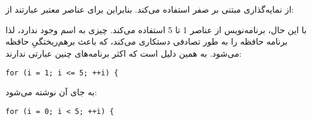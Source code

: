 \section{}
\paragraph{}\label{answer:90}
 از نمایه‌گذاری مبتنی بر صفر استفاده می‌کند. بنابراین برای  عناصر معتبر عبارتند از: 

با این حال، برنامه‌نویس از عناصر 1 تا 5 استفاده می‌کند. چیزی به اسم  وجود ندارد، لذا برنامه حافظه را به طور تصادفی دستکاری می‌کند، که باعث برهم‌ریختگیِ حافظه می‌شود. به همین دلیل است که اکثر برنامه‌های  چنین عبارتی ندارند:
\begin{LTR}
        \begin{lstlisting}[style=C++Style]
            for (i = 1; i <= 5; ++i) {
        \end{lstlisting}
\end{LTR}
به جای آن نوشته می‌شود:
\begin{LTR}
        \begin{lstlisting}[style=C++Style]
            for (i = 0; i < 5; ++i) {
        \end{lstlisting}
\end{LTR}
